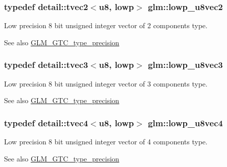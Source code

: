 \subsubsection[{\texorpdfstring{lowp\+\_\+u8vec2}{lowp_u8vec2}}]{\setlength{\rightskip}{0pt plus 5cm}typedef detail\+::tvec2$<$u8, lowp$>$ {\bf glm\+::lowp\+\_\+u8vec2}}\hypertarget{group__gtc__type__precision_ga8e5a056cbbcb70dca5c65950fa13a787}{}\label{group__gtc__type__precision_ga8e5a056cbbcb70dca5c65950fa13a787}
Low precision 8 bit unsigned integer vector of 2 components type. \begin{DoxySeeAlso}{See also}
\hyperlink{group__gtc__type__precision}{G\+L\+M\+\_\+\+G\+T\+C\+\_\+type\+\_\+precision} 
\end{DoxySeeAlso}
\subsubsection[{\texorpdfstring{lowp\+\_\+u8vec3}{lowp_u8vec3}}]{\setlength{\rightskip}{0pt plus 5cm}typedef detail\+::tvec3$<$u8, lowp$>$ {\bf glm\+::lowp\+\_\+u8vec3}}\hypertarget{group__gtc__type__precision_gaf0d7154052c636edf4a902fc8a4a56f2}{}\label{group__gtc__type__precision_gaf0d7154052c636edf4a902fc8a4a56f2}
Low precision 8 bit unsigned integer vector of 3 components type. \begin{DoxySeeAlso}{See also}
\hyperlink{group__gtc__type__precision}{G\+L\+M\+\_\+\+G\+T\+C\+\_\+type\+\_\+precision} 
\end{DoxySeeAlso}
\subsubsection[{\texorpdfstring{lowp\+\_\+u8vec4}{lowp_u8vec4}}]{\setlength{\rightskip}{0pt plus 5cm}typedef detail\+::tvec4$<$u8, lowp$>$ {\bf glm\+::lowp\+\_\+u8vec4}}\hypertarget{group__gtc__type__precision_ga98f82380862128fac9afae1b53840562}{}\label{group__gtc__type__precision_ga98f82380862128fac9afae1b53840562}
Low precision 8 bit unsigned integer vector of 4 components type. \begin{DoxySeeAlso}{See also}
\hyperlink{group__gtc__type__precision}{G\+L\+M\+\_\+\+G\+T\+C\+\_\+type\+\_\+precision} 
\end{DoxySeeAlso}
